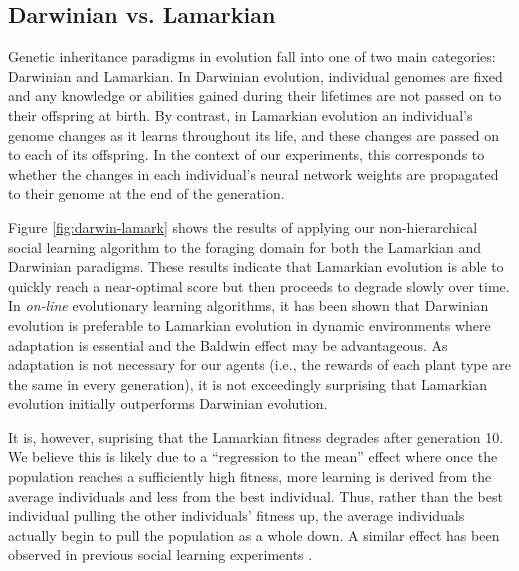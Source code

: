 \documentclass{acm_proc_article-sp}
\begin{document}
\subsection*{Darwinian vs. Lamarkian}
Genetic inheritance paradigms in evolution fall into one of two main categories: Darwinian and Lamarkian. In Darwinian evolution, individual genomes are fixed and any knowledge or abilities gained during their lifetimes are not passed on to their offspring at birth. By contrast, in Lamarkian evolution an individual's genome changes as it learns throughout its life, and these changes are passed on to each of its offspring. In the context of our experiments, this corresponds to whether the changes in each individual's neural network weights are propagated to their genome at the end of the generation.

Figure \ref{fig:darwin-lamark} shows the results of applying our non-hierarchical social learning algorithm to the foraging domain for both the Lamarkian and Darwinian paradigms. These results indicate that Lamarkian evolution is able to quickly reach a near-optimal score but then proceeds to degrade slowly over time. In \textit{on-line} evolutionary learning algorithms, it has been shown \cite{whiteson2006evolutionary} that Darwinian evolution is preferable to Lamarkian evolution in dynamic environments where adaptation is essential and the Baldwin effect \cite{simpson1953baldwin} may be advantageous. As adaptation is not necessary for our agents (i.e., the rewards of each plant type are the same in every generation), it is not exceedingly surprising that Lamarkian evolution initially outperforms Darwinian evolution.

It is, however, suprising that the Lamarkian fitness degrades after generation 10. We believe this is likely due to a ``regression to the mean'' effect where once the population reaches a sufficiently high fitness, more learning is derived from the average individuals and less from the best individual. Thus, rather than the best individual pulling the other individuals' fitness up, the average individuals actually begin to pull the population as a whole down. A similar effect has been observed in previous social learning experiments \cite{denaro1996cultural}.
\end{document}
